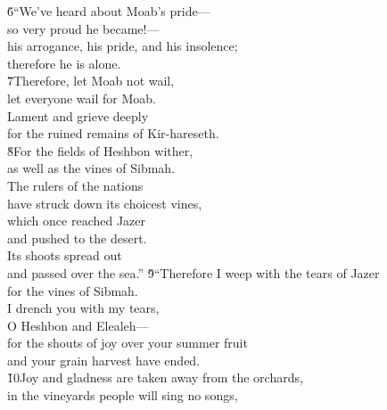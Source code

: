 \begin{poetry}
\poeml \v{6}``We've heard about Moab's pride--- \\
\poemll    so very proud he became!--- \\
\poeml his arrogance, his pride, and his insolence; \\
\poemll    therefore he is alone. \\
\poeml \v{7}Therefore, let Moab not wail, \\
\poemll    let everyone wail for Moab. \\
\poeml Lament and grieve deeply \\
\poemll    for the ruined remains of Kir-hareseth. \\
\poeml \v{8}For the fields of Heshbon wither, \\
\poemll    as well as the vines of Sibmah. \\
\poeml The rulers of the nations \\
\poeml have struck down its choicest vines, \\
\poeml which once reached Jazer \\
\poeml and pushed to the desert. \\
\poeml Its shoots spread out \\
\poeml and passed over the sea.''
\poeml \v{9}``Therefore I weep with the tears of Jazer \\
\poemll    for the vines of Sibmah. \\
\poeml I drench you with my tears, \\
\poemll    O Heshbon and Elealeh--- \\
\poeml for the shouts of joy over your summer fruit \\
\poemll    and your grain harvest have ended. \\
\poeml \v{10}Joy and gladness are taken away from the orchards, \\
\poemll    in the vineyards people will sing no songs, \\

\end{poetry}
